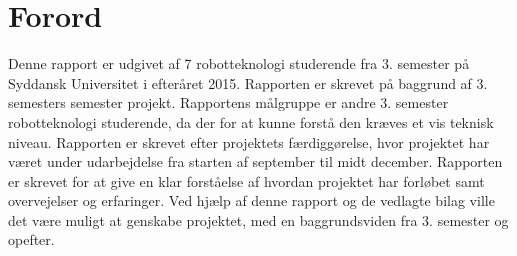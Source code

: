 \section*{Forord}
Denne rapport er udgivet af 7 robotteknologi studerende fra 3. semester på Syddansk Universitet i efteråret 2015. Rapporten er skrevet på baggrund af 3. semesters semester projekt. 
Rapportens målgruppe er andre 3. semester robotteknologi studerende, da der for at kunne forstå den kræves et vis teknisk niveau.
Rapporten er skrevet efter projektets færdiggørelse, hvor projektet har været under udarbejdelse fra starten af september til midt december.
Rapporten er skrevet for at give en klar forståelse af hvordan projektet har forløbet samt overvejelser og erfaringer.
Ved hjælp af denne rapport og de vedlagte bilag ville det være muligt at genskabe projektet, med en baggrundsviden fra 3. semester og opefter.